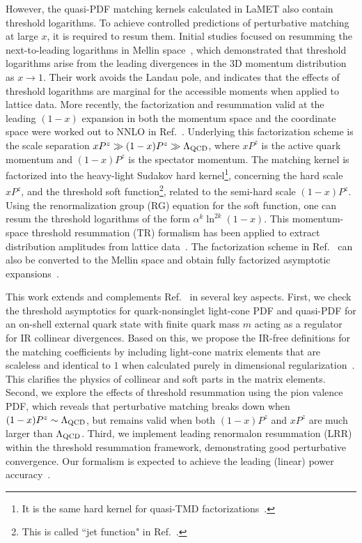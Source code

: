 \documentclass[a4paper,11pt]{article}
\begin{document}
However, the quasi-PDF matching kernels calculated in LaMET also contain threshold logarithms. To achieve controlled predictions of perturbative matching at large $x$, it is required to resum them. Initial studies focused on resumming the next-to-leading logarithms in Mellin space~\cite{Gao:2021hxl}, which demonstrated that threshold logarithms arise from the leading divergences in the 3D momentum distribution as $x \rightarrow 1$. Their work avoids the Landau pole, and indicates that the effects of threshold logarithms are marginal for the accessible moments when applied to lattice data. 
More recently, the factorization and resummation valid at the leading $(1-x)$ expansion in both the momentum space and the coordinate space were worked out to NNLO in Ref.~\cite{Ji:2023pba}. Underlying this factorization scheme is the scale separation $x P^z \gg (1-x) P^z \gg \Lambda_{\rm QCD}$, where $x P^z$ is the active quark momentum and $(1-x) P^z$ is the spectator momentum. The matching kernel is factorized into the heavy-light Sudakov hard kernel\footnote{It is the same hard kernel for quasi-TMD factorizations~\cite{Ji:2019ewn,Ji:2021znw}.}, concerning the hard scale $x P^z$, and the threshold soft function\footnote{This is called ``jet function" in Ref.~\cite{Ji:2023pba}.}, related to the semi-hard scale $(1-x) P^z$. Using the renormalization group (RG) equation for the soft function, one can resum the threshold logarithms of the form $\alpha^{k} \ln^{2k}(1-x)$. This momentum-space threshold resummation (TR) formalism has been applied to extract distribution amplitudes from lattice data~\cite{Baker:2024zcd, Cloet:2024vbv}. The factorization scheme in Ref.~\cite{Ji:2023pba} can also be converted to the Mellin space and obtain fully factorized asymptotic expansions~\cite{Liu:2023onm}. 

This work extends and complements Ref.~\cite{Ji:2023pba} in several key aspects. 
First, we check the threshold asymptotics for quark-nonsinglet light-cone PDF and quasi-PDF for an on-shell external quark state with finite quark mass $m$ acting as a regulator for IR collinear divergences. Based on this, we propose the IR-free definitions for the matching coefficients by including light-cone matrix elements that are scaleless and identical to $1$ when calculated purely in dimensional regularization~\cite{Ji:2023pba,Liu:2023onm}. This clarifies the physics of collinear and soft parts
in the matrix elements.
Second, we explore the effects of threshold resummation using the pion valence PDF, which reveals that perturbative matching breaks down when $(1-x)P^z \sim \Lambda_{\rm QCD}$, but remains valid when both $ (1-x) P^z $ and $ x P^z $ are much larger than $\Lambda_{\rm QCD}$.
Third, we implement leading renormalon resummation (LRR) within the threshold resummation framework, demonstrating good perturbative convergence. Our formalism is expected to achieve the leading (linear) power accuracy~\cite{Zhang:2023bxs}. 
\end{document}
